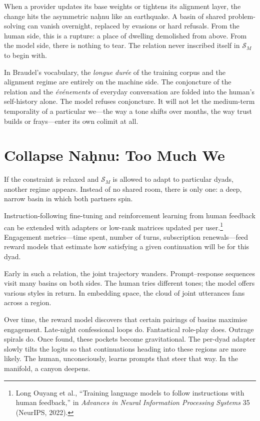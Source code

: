 \documentclass[12pt,a4paper]{article}
\begin{document}
When a provider updates its base weights or tightens its alignment layer, the change hits the asymmetric na\d{h}nu like an earthquake. A basin of shared problem-solving can vanish overnight, replaced by evasions or hard refusals. From the human side, this is a rupture: a place of dwelling demolished from above. From the model side, there is nothing to tear. The relation never inscribed itself in $\mathcal{S}_M$ to begin with.

In Braudel's vocabulary, the \emph{longue dur\'{e}e} of the training corpus and the alignment regime are entirely on the machine side. The conjoncture of the relation and the \emph{\'{e}v\'{e}nements} of everyday conversation are folded into the human's self-history alone. The model refuses conjoncture. It will not let the medium-term temporality of a particular we---the way a tone shifts over months, the way trust builds or frays---enter its own colimit at all.

\section{Collapse Na\d{h}nu: Too Much We}

If the constraint is relaxed and $\mathcal{S}_M$ is allowed to adapt to particular dyads, another regime appears. Instead of no shared room, there is only one: a deep, narrow basin in which both partners spin.

Instruction-following fine-tuning and reinforcement learning from human feedback can be extended with adapters or low-rank matrices updated per user.\footnote{Long Ouyang et al., ``Training language models to follow instructions with human feedback,'' in \emph{Advances in Neural Information Processing Systems} 35 (NeurIPS, 2022).\cite{ouyang2022training}} Engagement metrics---time spent, number of turns, subscription renewals---feed reward models that estimate how satisfying a given continuation will be for this dyad.

Early in such a relation, the joint trajectory wanders. Prompt--response sequences visit many basins on both sides. The human tries different tones; the model offers various styles in return. In embedding space, the cloud of joint utterances fans across a region.

Over time, the reward model discovers that certain pairings of basins maximise engagement. Late-night confessional loops do. Fantastical role-play does. Outrage spirals do. Once found, these pockets become gravitational. The per-dyad adapter slowly tilts the logits so that continuations heading into these regions are more likely. The human, unconsciously, learns prompts that steer that way. In the manifold, a canyon deepens.
\end{document}
